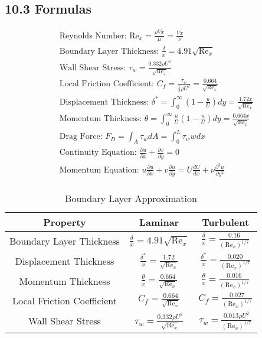 \subsection*{10.3 Formulas}
\begin{fleqn}
    \begin{align*}
        &\text{Reynolds Number: } \text{Re}_x = \frac{\rho V x}{\mu}  = \frac{V x}{\nu} \\
        &\text{Boundary Layer Thickness: } \frac{\delta}{x} = 4.91 \sqrt{\text{Re}_x} \\
        &\text{Wall Shear Stress: } \tau_w = \frac{0.332 \rho U^2}{\sqrt{\text{Re}_x}} \\
        &\text{Local Friction Coefficient: } C_f = \frac{\tau_w}{\frac{1}{2} \rho U^2} = \frac{0.664}{\sqrt{\text{Re}_x}} \\
        &\text{Displacement Thickness: } \delta^* = \int_0^\infty \left(1 - \frac{u}{U}\right) dy = \frac{1.72 x}{\sqrt{\text{Re}_x}} \\
        &\text{Momentum Thickness: } \theta = \int_0^\infty \frac{u}{U} \left(1 - \frac{u}{U}\right) dy = \frac{0.664 x}{\sqrt{\text{Re}_x}} \\   
        &\text{Drag Force: } F_D = \int_A \tau_w dA = \int_0^L \tau_w w dx \\
        &\text{Continuity Equation: } \frac{\partial u}{\partial x} + \frac{\partial v}{\partial y} = 0 \\
        &\text{Momentum Equation: } u \frac{\partial u}{\partial x} + v \frac{\partial u}{\partial y} = U \frac{dU}{dx} + \nu \frac{\partial^2 u}{\partial y^2} \\
    \end{align*}
\end{fleqn}

\begin{table}[H]
    \caption{Boundary Layer Approximation}
    \label{tab:boundary_layer_approximation}
    \centering
    \begin{tabular}{ccc}
        \hline
        Property & Laminar & Turbulent \\
        \hline
        {\tiny Boundary Layer Thickness} & $\frac{\delta}{x} = 4.91 \sqrt{\text{Re}_x}$ & $\frac{\delta}{x} = \frac{0.16}{(\text{Re}_x)^{1/7}}$ \\
        {\tiny Displacement Thickness} & $\frac{\delta^*}{x} = \frac{1.72}{\sqrt{\text{Re}_x}}$ & $\frac{\delta^*}{x} = \frac{0.020}{(\text{Re}_x)^{1/7}}$ \\
        {\tiny Momentum Thickness} & $\frac{\theta}{x} = \frac{0.664}{\sqrt{\text{Re}_x}}$ & $\frac{\theta}{x} = \frac{0.016}{(\text{Re}_x)^{1/7}}$ \\   
        {\tiny Local Friction Coefficient} & $C_f = \frac{0.664}{\sqrt{\text{Re}_x}}$ & $C_f = \frac{0.027}{(\text{Re}_x)^{1/7}}$ \\
        {\tiny Wall Shear Stress} & $\tau_w = \frac{0.332 \rho U^2}{\sqrt{\text{Re}_x}}$ & $\tau_w = \frac{0.013 \rho U^2}{(\text{Re}_x)^{1/7}}$ \\
        \hline
    \end{tabular}
\end{table}